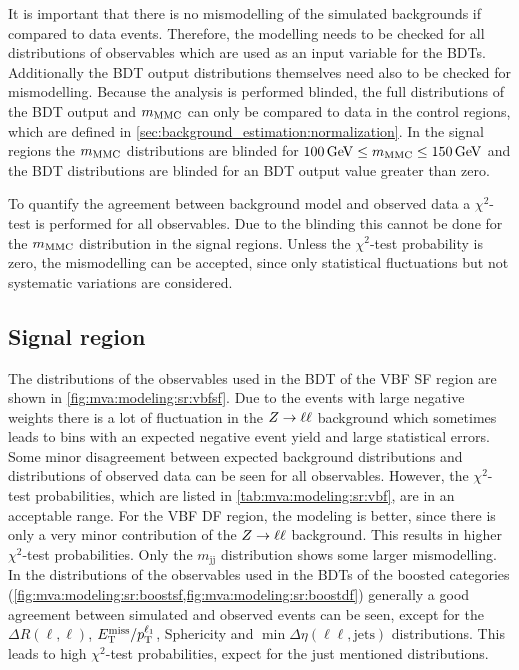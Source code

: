 It is important that there is no mismodelling of the simulated backgrounds if compared to data events.
Therefore, the modelling needs to be checked for all distributions of observables which are used as an input variable for the BDTs.
Additionally the BDT output distributions themselves need also to be checked for mismodelling.
Because the analysis is performed blinded, the full distributions of the BDT output and $m_\text{MMC}$ can only be compared to data in the control regions, which
are defined in \cref{sec:background_estimation:normalization}.
In the signal regions the $m_\text{MMC}$ distributions are blinded for $\SI{100}{\GeV} \leq \mmc \leq \SI{150}{\GeV}$
and the BDT distributions are blinded for an BDT output value greater than zero.

To quantify the agreement between background model and observed data a $\chi^2$-test is performed for all observables.
Due to the blinding this cannot be done for the $m_\text{MMC}$ distribution in the signal regions.
Unless the $\chi^2$-test probability is zero, the mismodelling can be accepted, since only statistical fluctuations but
not systematic variations are considered.

\subsection{Signal region}

The distributions of the observables used in the BDT of the VBF SF region are shown in \cref{fig:mva:modeling:sr:vbfsf}.
Due to the events with large negative weights there is a lot of fluctuation in the $Z \to \ell \ell$ background which sometimes leads
to bins with an expected negative event yield and large statistical errors.
Some minor disagreement between expected background distributions and distributions of observed data can be seen for
all observables.
However, the $\chi^2$-test probabilities, which are listed in \cref{tab:mva:modeling:sr:vbf}, are in an acceptable range.
For the VBF DF region, the modeling is better, since there is only a very minor contribution of the $Z \to \ell \ell$ background.
This results in higher $\chi^2$-test probabilities.
Only the $m_\text{jj}$ distribution shows some larger mismodelling.
In the distributions of the observables used in the BDTs of the boosted categories (\cref{fig:mva:modeling:sr:boostsf,fig:mva:modeling:sr:boostdf})
generally a good agreement between simulated and observed events can be seen, except for the $\Delta R (\ell, \ell)$,
$E_\text{T}^\text{miss} / p_\text{T}^{\ell_1}$, Sphericity and $\min \Delta \eta (\ell\ell, \text{jets})$ distributions.
This leads to high $\chi^2$-test probabilities, expect for the just mentioned distributions.

